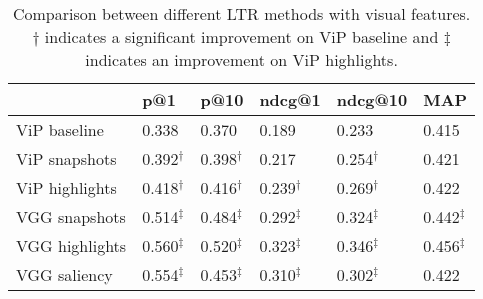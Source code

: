 
%


\begin{table}[h]
\caption{Comparison between different \ac{LTR} methods with visual features. $\dagger$ indicates a significant improvement on ViP baseline and $\ddagger$ indicates an improvement on ViP highlights.}
\label{tab:visresults}
\centering
\begin{tabular}{llllll}
\toprule
                      & p@1    & p@10  & ndcg@1  & ndcg@10 & MAP   \\ 
\midrule
ViP baseline          & 0.338  & 0.370 & 0.189   & 0.233   & 0.415 \\ 
\midrule
ViP snapshots         & 0.392$^\dagger$ & 0.398$^\dagger$ & 0.217   & 0.254$^\dagger$   & 0.421 \\ 
ViP highlights        & 0.418$^\dagger$  & 0.416$^\dagger$ & 0.239$^\dagger$   & 0.269$^\dagger$   & 0.422 \\
\midrule
VGG snapshots      & 0.514$^\ddagger$    & 0.484$^\ddagger$ & 0.292$^\ddagger$   & 0.324$^\ddagger$   & 0.442$^\ddagger$ \\ 
VGG highlights     & 0.560$^\ddagger$    & 0.520$^\ddagger$ & 0.323$^\ddagger$   & 0.346$^\ddagger$   & 0.456$^\ddagger$ \\ 
\midrule
VGG saliency       & 0.554$^\ddagger$    & 0.453$^\ddagger$ & 0.310$^\ddagger$   & 0.302$^\ddagger$   & 0.422 \\ 
\bottomrule
\end{tabular}
\end{table}

